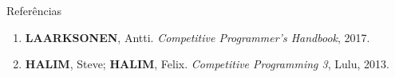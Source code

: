 \begin{frame}[fragile]{Referências}

    \begin{enumerate}
        \item \textbf{LAARKSONEN}, Antti. \textit{Competitive Programmer's Handbook}, 2017.

        \item \textbf{HALIM}, Steve; \textbf{HALIM}, Felix. \textit{Competitive Programming 3}, Lulu, 2013.
    \end{enumerate}

\end{frame}
